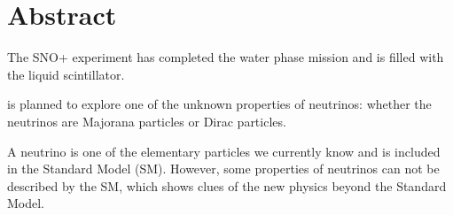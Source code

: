 \section{Abstract}

The SNO+ experiment has completed the water phase mission and is filled with the liquid scintillator.



is planned to explore one of the unknown properties of neutrinos: whether the neutrinos are Majorana particles or Dirac particles.


A neutrino is one of the elementary particles we currently know and is included in the Standard Model (SM). However, some properties of neutrinos can not be described by the SM, which shows clues of the new physics beyond the Standard Model.
